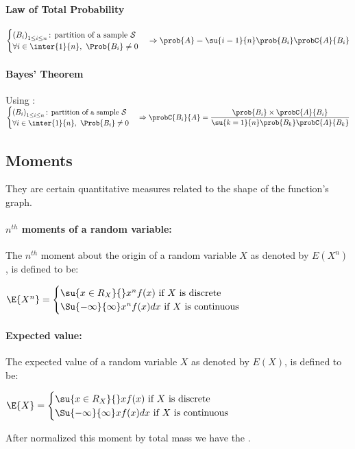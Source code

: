 \paragraph{Law of Total Probability}
$
\begin{cases}
    \left(B_{i}\right)_{1\leq i\leq n}\text{: partition of a sample }\mathcal{S}\\
    \forall i\in \inter{1}{n},~\Prob{B_{i}} \neq 0
\end{cases} 
\Rightarrow \prob{A} = \su{i=1}{n}\prob{B_{i}}\probC{A}{B_{i}}
$


\paragraph{Bayes' Theorem}
Using :\\
$
\begin{cases}
    \left(B_{i}\right)_{1\leq i\leq n}\text{: partition of a sample }\mathcal{S}\\
    \forall i\in \inter{1}{n},~\Prob{B_{i}} \neq 0
\end{cases} 
\Rightarrow \probC{B_{i}}{A} = \dfrac{\prob{B_{i}}\times\probC{A}{B_{i}}}{\su{k=1}{n}\prob{B_{k}}\probC{A}{B_{k}}}
$


\subsection{Moments}
They are certain quantitative measures related to the shape of the function's graph.
\cite{wiki:moments_mathematics}
\paragraph{$n^{th}$ moments of a random variable:}
The $n^{th}$ moment about the origin of a random variable $X$ as denoted by
$E\left( X^{n} \right)$, is defined to be:
\begin{center}
	$\E{X^{n}}=
	\begin{cases}
		\su{x\in R_{X}}{{}}x^{n}f(x)\text{ if }X\text{ is discrete}\\
		\Su{-\infty}{\infty}x^{n}f(x)dx\text{ if }X\text{ is continuous}
	\end{cases}$
\end{center}

\paragraph{Expected value:}
The expected value of a random variable $X$ as denoted by
$E\left( X \right)$, is defined to be:
\begin{center}
	$\E{X}=
	\begin{cases}
		\su{x\in R_{X}}{{}}xf(x)\text{ if }X\text{ is discrete}\\
		\Su{-\infty}{\infty}xf(x)dx\text{ if }X\text{ is continuous}
	\end{cases}$
\end{center}
After normalized this moment by total mass we have the .


